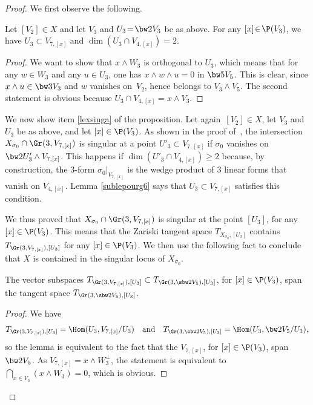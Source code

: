 \pagebreak[2]
\begin{proof}
We first observe the following.

\begin{lemm}
\label{sublepourg6}
Let $[V_2]\!\in\!X$
and let $V_3$ and $U_3\!=\!\bw2V_3$ be as above. For any $[x]\!\in\!\P(V_3)$, we have $U_3\subset V_{7,[x]}$ and $\dim (U_3\cap V_{4,[x]})=2$.
\end{lemm}

\begin{proof} We want to show that $x\wedge W_3$ is orthogonal to
$U_3$, which means that
for any $w\in W_3$ and any $u\in U_3$, one has $x\wedge w\wedge u=0$ in $\bw5V_5$. This is clear, since
$x\wedge u\in \bw3V_3$ and $w$ vanishes on~$V_2$, hence belongs to $V_3\wedge V_5$.
The second statement is obvious because $U_3\cap V_{4,[x]}=x\wedge V_3$.
\end{proof}

We now show item \eqref{lexsinga} of the proposition. Let again~\mbox{$[V_2]\in X$,} let $V_3$ and $U_3$ be as above, and let $[x]\in \P(V_3)$. As shown in the proof of~\cite[Prop.\,3.1]{devo}, the intersection $X_{\sigma_0}\cap \Gr(3,V_{7,[x]})$ is singular at a point $U'_3\subset V_{7,[x]}$ if $\sigma_0$ vanishes on $\bw2U'_3\wedge V_{7,[x]}$. This happens if $\dim(U'_3\cap V_{4,[x]})\ge2$ because, by construction, the $3$-form $\sigma_0\vert_{ V_{7,[x]}}$ is the wedge product of 3 linear forms that vanish on $V_{4,[x]}$.
Lemma \ref{sublepourg6} says that $U_3\subset V_{7,[x]}$ satisfies this condition.

We thus proved that
$X_{\sigma_0}\cap \Gr(3,V_{7,[x]})$ is singular at the point $[U_3]$, for any $[x]\in \P(V_3)$.
This means that the Zariski tangent space $T_{X_{\sigma_0},[U_3]}$ contains $T_{\Gr(3,V_{7,[x]}),[U_3]}$ for any $[x]\in \P(V_3)$. We then use the following fact to conclude that $X$ is contained in the singular locus of $X_{\sigma_0}$.

\begin{lemm}\label{lepourpropsingx}
The vector subspaces $T_{\Gr(3,V_{7,[x]}),[U_3]}\subset
T_{\Gr(3,\sbw2V_5),[U_3]}$, for $[x]\in \P(V_3)$, span the tangent space $T_{\Gr(3,\sbw2V_5),[U_3]}$.
\end{lemm}

\begin{proof} We have
\[
T_{\Gr(3,V_{7,[x]}),[U_3]}=\Hom (U_3,V_{7,[x]}/U_3)\quad\text{and}\quad T_{\Gr(3,\sbw2V_5),[U_3]}=\Hom (U_3,\bw2V_5/U_3),
\]
so the lemma is equivalent to the fact that the $V_{7,[x]}$, for $[x]\in \P(V_3)$, span $\bw2V_5$. As
$V_{7,[x]}=x\wedge W_3^{\perp}$, the statement is equivalent to
$\bigcap_{x\in V_3}(x\wedge W_3)=0$, which is obvious.
\end{proof}


\end{proof}
